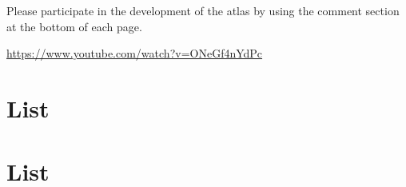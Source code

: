 \documentclass[
  letterpaper,
  paper=6in:9in,
  pagesize=pdftex,
  headinclude=on,
  footinclude=on,
  12pt]{scrbook}
\begin{document}
\hypertarget{section-8}{%
\chapter{}\label{section-8}}

Please participate in the development of the atlas by using the comment
section at the bottom of each page.

\url{https://www.youtube.com/watch?v=ONeGf4nYdPc}

\hypertarget{list}{%
\chapter{List}\label{list}}

\hypertarget{list-1}{%
\chapter{List}\label{list-1}}


\backmatter
\end{document}
